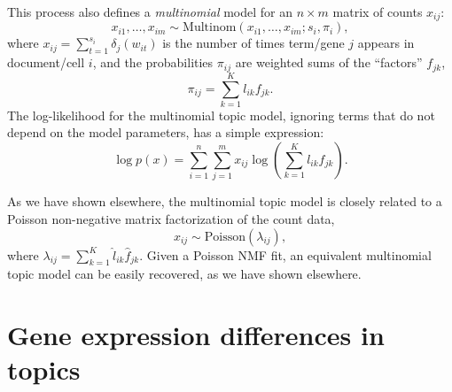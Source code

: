 \documentclass[final]{siamart171218}
\begin{document}
This process also defines a {\em multinomial} model for an $n \times
m$ matrix of counts $x_{ij}$:
\begin{equation}
x_{i1}, \ldots, x_{im} \sim
\mathrm{Multinom}(x_{i1}, \ldots, x_{im}; s_i, \pi_i),
\end{equation}
where $x_{ij} = \sum_{t=1}^{s_i} \delta_j(w_{it})$ is the number of
times term/gene $j$ appears in document/cell $i$, and the
probabilities $\pi_{ij}$ are weighted sums of the ``factors''
$f_{jk}$,
\begin{equation}
\pi_{ij} = \sum_{k=1}^K l_{ik} f_{jk}.
\end{equation}
The log-likelihood for the multinomial topic model, ignoring terms
that do not depend on the model parameters, has a simple expression:
\begin{equation}
\log p(x) = \sum_{i=1}^n \sum_{j=1}^m
x_{ij} \log({\textstyle \sum_{k=1}^K l_{ik} f_{jk}}).
\end{equation}

As we have shown elsewhere, the multinomial topic model is closely
related to a Poisson non-negative matrix factorization of the count
data,
\begin{equation}
x_{ij} \sim \mathrm{Poisson}(\lambda_{ij}),
\end{equation}
where $\lambda_{ij} = \sum_{k=1}^K \hat{l}_{ik} \hat{f}_{jk}$. Given a
Poisson NMF fit, an equivalent multinomial topic model can be easily
recovered, as we have shown elsewhere.

\section{Gene expression differences in topics}
\end{document}
